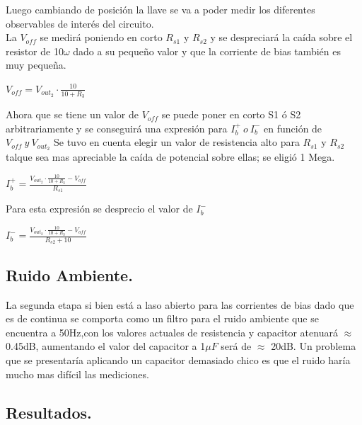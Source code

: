 Luego cambiando de posición la llave se va a poder medir los diferentes observables de interés del circuito.\\
La $V_{off}$ se medirá poniendo en corto $R_{s1}$ y $R_{s2}$ y se despreciará la caída sobre el resistor de 10$\omega$ dado a su pequeño valor y que la corriente de bias también es muy pequeña.\\
\begin{center}$V_{off}=V_{out_2} \cdot \frac{10}{10+R_3} $\end{center}
Ahora que se tiene un valor de $V_{off}$ se  puede poner en corto S1 ó S2 arbitrariamente y se conseguirá una expresión para $ I_b^+ \ o \  I_b^-$ en función de $V_{off} \ y \ V_{out_2}$
Se tuvo en cuenta elegir un valor de resistencia alto para $R_{s1}$ y $R_{s2}$ talque sea mas apreciable la caída de potencial sobre ellas; se eligió 1 Mega.\\
\begin{center}$I_b^+=\frac{V_{out_2} \cdot \frac{10}{10+R_3}-V_{off}}{R_{s1}}$\end{center}
Para esta expresión se desprecio el valor de $I_b^-$
\begin{center}$I_b^-=\frac{V_{out_2} \cdot \frac{10}{10+R_3}-V_{off}}{R_{s2}+10}$\end{center}

\subsection{Ruido Ambiente.}
La segunda etapa si bien está a laso abierto para las corrientes de bias dado que es de continua se comporta como un filtro para el ruido ambiente que se encuentra a 50Hz,con los valores actuales de resistencia y capacitor atenuará $\approx$ 0.45dB, aumentando el valor del capacitor a 1$\mu F$ será de  $\approx$ 20dB.
Un problema que se presentaría aplicando un capacitor demasiado chico es que el ruido haría mucho mas difícil las mediciones.
\subsection{Resultados.}
